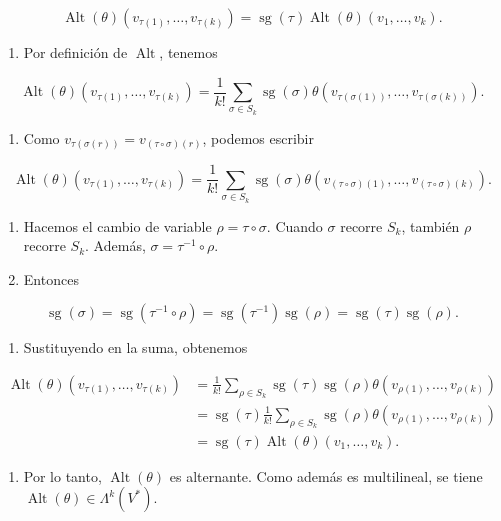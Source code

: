 \begin{bookproof}{}
\[
\operatorname{Alt}(\theta)(v_{\tau(1)},\dots,v_{\tau(k)})=\operatorname{sg}(\tau)\operatorname{Alt}(\theta)(v_1,\dots,v_k).
\]
\begin{enumerate}[start=5]
\item Por definición de $\operatorname{Alt}$, tenemos
\end{enumerate}
\[
\operatorname{Alt}(\theta)(v_{\tau(1)},\dots,v_{\tau(k)})=\frac{1}{k!}\sum_{\sigma\in S_k}\operatorname{sg}(\sigma)\theta(v_{\tau(\sigma(1))},\dots,v_{\tau(\sigma(k))}).
\]
\begin{enumerate}[start=6]
\item Como $v_{\tau(\sigma(r))}=v_{(\tau\circ\sigma)(r)}$, podemos escribir
\end{enumerate}
\[
\operatorname{Alt}(\theta)(v_{\tau(1)},\dots,v_{\tau(k)})=\frac{1}{k!}\sum_{\sigma\in S_k}\operatorname{sg}(\sigma)\theta(v_{(\tau\circ\sigma)(1)},\dots,v_{(\tau\circ\sigma)(k)}).
\]
\begin{enumerate}[start=7]
\item Hacemos el cambio de variable $\rho=\tau\circ\sigma$. Cuando $\sigma$ recorre $S_k$, también $\rho$ recorre $S_k$. Además, $\sigma=\tau^{-1}\circ\rho$.
\item Entonces
\end{enumerate}
\[
\operatorname{sg}(\sigma)=\operatorname{sg}(\tau^{-1}\circ\rho)=\operatorname{sg}(\tau^{-1})\operatorname{sg}(\rho)=\operatorname{sg}(\tau)\operatorname{sg}(\rho).
\]
\begin{enumerate}[start=9]
\item Sustituyendo en la suma, obtenemos
\end{enumerate}
\[
\begin{aligned}\operatorname{Alt}(\theta)(v_{\tau(1)},\dots,v_{\tau(k)})&=\frac{1}{k!}\sum_{\rho\in S_k}\operatorname{sg}(\tau)\operatorname{sg}(\rho)\theta(v_{\rho(1)},\dots,v_{\rho(k)})\\&=\operatorname{sg}(\tau)\frac{1}{k!}\sum_{\rho\in S_k}\operatorname{sg}(\rho)\theta(v_{\rho(1)},\dots,v_{\rho(k)})\\&=\operatorname{sg}(\tau)\operatorname{Alt}(\theta)(v_1,\dots,v_k).\end{aligned}
\]
\begin{enumerate}[start=10]
\item Por lo tanto, $\operatorname{Alt}(\theta)$ es alternante. Como además es multilineal, se tiene $\operatorname{Alt}(\theta)\in\Lambda^k(V^*)$.
\end{enumerate}
\begin{itemize}

\end{itemize}
\end{bookproof}
